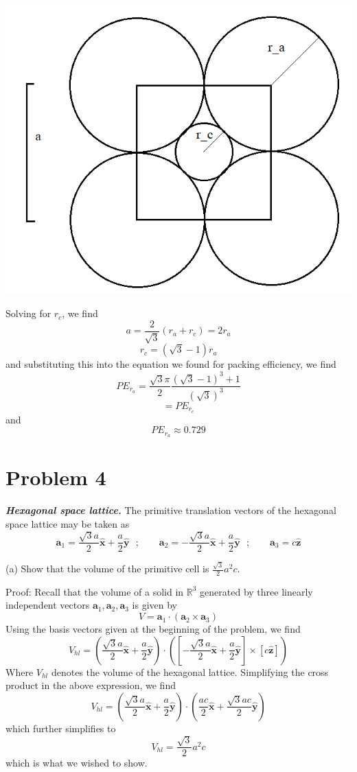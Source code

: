 \documentclass{article}
\begin{document}
\begin{center}
    \includegraphics[scale = 0.5]{CsClraLim.PNG}
\end{center}
Solving for $r_c$, we find
\[a = \frac{2}{\sqrt{3}}(r_a + r_c) = 2r_a\]
\[r_c = (\sqrt{3}-1)r_a\]
and substituting this into the equation we found for packing efficiency, we find
\[PE_{r_a} = \frac{\sqrt{3}\pi}{2} \frac{(\sqrt{3}-1)^3 + 1}{(\sqrt{3})^3}\]
\[= PE_{r_c}\]
and 
\[PE_{r_a} \approx 0.729\]


\section*{Problem 4}


\textbf{\textit{Hexagonal space lattice.}}  The primitive translation vectors of the hexagonal space lattice may be taken as 
\[\textbf{a}_1 = \frac{\sqrt{3}a}{2}\hat{\textbf{{x}}} + \frac{a}{2}\hat{\textbf{y}} \:\:\: ; \:\:\:\:\:\:\:\:\: \textbf{a}_2 = -\frac{\sqrt{3}a}{2}\hat{\textbf{x}} + \frac{a}{2}\hat{\textbf{y}} \:\:\: ; \:\:\:\:\:\:\:\:\: \textbf{a}_3 = c\hat{\textbf{z}}\]

(a) Show that the volume of the primitive cell is $\frac{\sqrt{3}}{2}a^2c$.
\newline

Proof: Recall that the volume of a solid in $\mathbb{R}^3$ generated by three linearly independent vectors $\textbf{a}_1, \textbf{a}_2, \textbf{a}_3$ is given by
\[V = \textbf{a}_1 \cdot (\textbf{a}_2 \times \textbf{a}_3)\]
Using the basis vectors given at the beginning of the problem, we find
\[V_{hl} = \left( \frac{\sqrt{3}a}{2}\hat{\textbf{x}} + \frac{a}{2}\hat{\textbf{y}} \right) \cdot \left(\left[ -\frac{\sqrt{3}a}{2} \hat{\textbf{x}} + \frac{a}{2} \hat{\textbf{y}} \right] \times \left[ c \hat{\textbf{z}} \right]\right)\]
Where $V_{hl}$ denotes the volume of the hexagonal lattice. Simplifying the cross product in the above expression, we find
\[V_{hl} = \left( \frac{\sqrt{3}a}{2}\hat{\textbf{x}} + \frac{a}{2} \hat{\textbf{y}} \right) \cdot \left( \frac{ac}{2}\hat{\textbf{x}} + \frac{\sqrt{3}ac}{2} \hat{\textbf{y}} \right)\]
which further simplifies to
\[V_{hl} = \frac{\sqrt{3}}{2}a^2c\]
which is what we wished to show.
\newline
\end{document}
